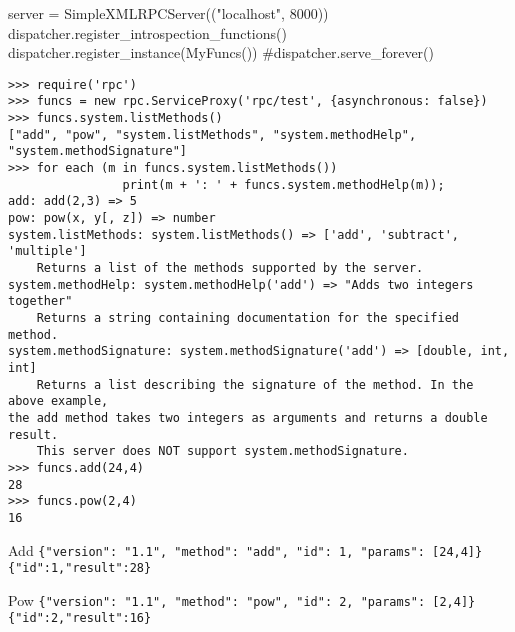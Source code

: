 server = SimpleXMLRPCServer(("localhost", 8000))
dispatcher.register_introspection_functions()
dispatcher.register_instance(MyFuncs())
#dispatcher.serve_forever()

\begin{lstlisting}[style=consola]
>>> require('rpc')
>>> funcs = new rpc.ServiceProxy('rpc/test', {asynchronous: false})
>>> funcs.system.listMethods()
["add", "pow", "system.listMethods", "system.methodHelp", "system.methodSignature"]
>>> for each (m in funcs.system.listMethods())
				print(m + ': ' + funcs.system.methodHelp(m));
add: add(2,3) => 5
pow: pow(x, y[, z]) => number
system.listMethods: system.listMethods() => ['add', 'subtract', 'multiple']
	Returns a list of the methods supported by the server.
system.methodHelp: system.methodHelp('add') => "Adds two integers together"
	Returns a string containing documentation for the specified method.
system.methodSignature: system.methodSignature('add') => [double, int, int]
	Returns a list describing the signature of the method. In the above example,
the add method takes two integers as arguments and returns a double result.
	This server does NOT support system.methodSignature.
>>> funcs.add(24,4)
28
>>> funcs.pow(2,4)
16
\end{lstlisting}

Add
\rightarrow \verb|{"version": "1.1", "method": "add", "id": 1, "params": [24,4]}|
\rightarrow \verb|{"id":1,"result":28}|

Pow
\rightarrow \verb|{"version": "1.1", "method": "pow", "id": 2, "params": [2,4]}|
\leftarrow \verb|{"id":2,"result":16}|
